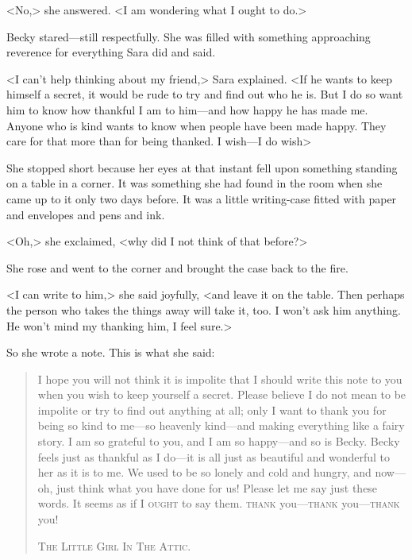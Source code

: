 <No,> she answered. <I am wondering what I ought to do.>

Becky stared—still respectfully. She was filled with something approaching reverence for everything Sara did and said.

<I can't help thinking about my friend,> Sara explained. <If he wants to keep himself a secret, it would be rude to try and find out who he is. But I do so want him to know how thankful I am to him—and how happy he has made me. Anyone who is kind wants to know when people have been made happy. They care for that more than for being thanked. I wish—I do wish\longdash>

She stopped short because her eyes at that instant fell upon something standing on a table in a corner. It was something she had found in the room when she came up to it only two days before. It was a little writing-case fitted with paper and envelopes and pens and ink.

<Oh,> she exclaimed, <why did I not think of that before?>

She rose and went to the corner and brought the case back to the fire.

<I can write to him,> she said joyfully, <and leave it on the table. Then perhaps the person who takes the things away will take it, too. I won't ask him anything. He won't mind my thanking him, I feel sure.>

So she wrote a note. This is what she said:

\begin{quotation}
	
I hope you will not think it is impolite that I should write this note to you when you wish to keep yourself a secret. Please believe I do not mean to be impolite or try to find out anything at all; only I want to thank you for being so kind to me—so heavenly kind—and making everything like a fairy story. I am so grateful to you, and I am so happy—and so is Becky. Becky feels just as thankful as I do—it is all just as beautiful and wonderful to her as it is to me. We used to be so lonely and cold and hungry, and now—oh, just think what you have done for us! Please let me say just these words. It seems as if I \textsc{ought} to say them. \textsc{thank} you—\textsc{thank} you—\textsc{thank} you!

\begin{flushright}\scshape
The Little Girl In The Attic.
\end{flushright}
\end{quotation}


